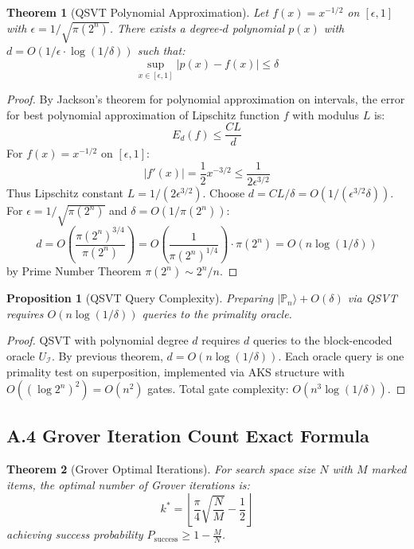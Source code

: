 \documentclass[11pt,letterpaper]{article}
\newtheorem{theorem}{Theorem}
\newtheorem{proposition}{Proposition}
\begin{document}
\begin{theorem}[QSVT Polynomial Approximation]
Let $f(x) = x^{-1/2}$ on $[\epsilon, 1]$ with $\epsilon = 1/\sqrt{\pi(2^n)}$. There exists a degree-$d$ polynomial $p(x)$ with $d = O(1/\epsilon \cdot \log(1/\delta))$ such that:
\[
\sup_{x \in [\epsilon, 1]} |p(x) - f(x)| \leq \delta
\]
\end{theorem}

\begin{proof}
By Jackson's theorem for polynomial approximation on intervals, the error for best polynomial approximation of Lipschitz function $f$ with modulus $L$ is:
\[
E_d(f) \leq \frac{CL}{d}
\]
For $f(x) = x^{-1/2}$ on $[\epsilon, 1]$:
\[
|f'(x)| = \frac{1}{2}x^{-3/2} \leq \frac{1}{2\epsilon^{3/2}}
\]
Thus Lipschitz constant $L = 1/(2\epsilon^{3/2})$. Choose $d = CL/\delta = O(1/(\epsilon^{3/2}\delta))$. For $\epsilon = 1/\sqrt{\pi(2^n)}$ and $\delta = O(1/\pi(2^n))$:
\[
d = O\left(\frac{\pi(2^n)^{3/4}}{\pi(2^n)}\right) = O\left(\frac{1}{\pi(2^n)^{1/4}}\right) \cdot \pi(2^n) = O(n\log(1/\delta))
\]
by Prime Number Theorem $\pi(2^n) \sim 2^n/n$.
\end{proof}

\begin{proposition}[QSVT Query Complexity]
Preparing $|\mathbb{P}_n\rangle + O(\delta)$ via QSVT requires $O(n\log(1/\delta))$ queries to the primality oracle.
\end{proposition}

\begin{proof}
QSVT with polynomial degree $d$ requires $d$ queries to the block-encoded oracle $U_{\mathcal{I}}$. By previous theorem, $d = O(n\log(1/\delta))$. Each oracle query is one primality test on superposition, implemented via AKS structure with $O((\log 2^n)^2) = O(n^2)$ gates. Total gate complexity: $O(n^3\log(1/\delta))$.
\end{proof}

\subsection{A.4 Grover Iteration Count Exact Formula}

\begin{theorem}[Grover Optimal Iterations]
For search space size $N$ with $M$ marked items, the optimal number of Grover iterations is:
\[
k^* = \left\lfloor \frac{\pi}{4}\sqrt{\frac{N}{M}} - \frac{1}{2} \right\rfloor
\]
achieving success probability $P_{\text{success}} \geq 1 - \frac{M}{N}$.
\end{theorem}
\end{document}
